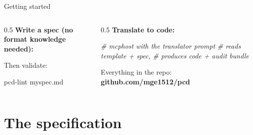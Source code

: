 \documentclass[
  10pt,
  ignorenonframetext,
  aspectratio=169,
  10pt]{beamer}
\newenvironment{Shaded}{}{}
\newcommand{\CommentTok}[1]{\textcolor[rgb]{0.38,0.63,0.69}{\textit{#1}}}
\newcommand{\DataTypeTok}[1]{\textcolor[rgb]{0.56,0.13,0.00}{#1}}
\newcommand{\ExtensionTok}[1]{#1}
\newcommand{\FunctionTok}[1]{\textcolor[rgb]{0.02,0.16,0.49}{#1}}
\newcommand{\NormalTok}[1]{#1}
\newcommand{\StringTok}[1]{\textcolor[rgb]{0.25,0.44,0.63}{#1}}
\newcommand{\VariableTok}[1]{\textcolor[rgb]{0.10,0.09,0.49}{#1}}
\begin{document}
\begin{frame}[fragile]{Getting started}
\protect\hypertarget{getting-started}{}
\begin{columns}[T]
\begin{column}{0.5\textwidth}
\textbf{Write a spec (no format knowledge needed):}

\begin{Shaded}
\end{Shaded}

Then validate:

\begin{Shaded}
\begin{Highlighting}[]
\ExtensionTok{pcd{-}lint}\NormalTok{ myspec.md}
\end{Highlighting}
\end{Shaded}
\end{column}

\begin{column}{0.5\textwidth}
\textbf{Translate to code:}

\begin{Shaded}
\begin{Highlighting}[]
\CommentTok{\# mcphost with the translator prompt}
\CommentTok{\# reads template + spec,}
\CommentTok{\# produces code + audit bundle}
\end{Highlighting}
\end{Shaded}

\bigskip

Everything in the repo:\\
\textbf{github.com/mge1512/pcd}
\end{column}
\end{columns}
\end{frame}

\hypertarget{the-specification-1}{%
\section{The specification}\label{the-specification-1}}
\end{document}
